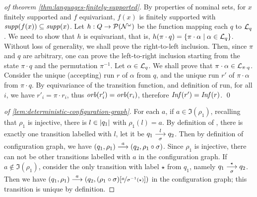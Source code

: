 
\begin{proof}[of theorem \ref{thm:languages-finitely-supported}]
By properties of nominal sets, for $x$ finitely supported and $f$ equivariant, $f(x)$ is finitely supported with $\mathit{supp}(f(x))\subseteq \mathit{supp}(x)$. Let $h : Q \to \mathcal{P}(\mathcal{N}^\omega)$ be the function mapping each $q$ to $\mathcal{L}_q$. We need to show that $h$ is equivariant, that is, $h(\pi \cdot q) = \{ \pi \cdot \alpha \mid \alpha \in \mathcal{L}_q\}$. Without loss of generality, we shall prove the right-to-left inclusion. Then, since $\pi$ and $q$ are arbitrary, one can prove the left-to-right inclusion starting from the state $\pi \cdot q$ and the permutation $\pi^{-1}$. Let $\alpha \in \mathcal{L}_q$. We shall prove that $\pi\cdot\alpha \in \mathcal{L}_{\pi\cdot q}$. Consider the unique (accepting) run $r$ of $\alpha$ from $q$, and  the unique run $r'$ of $\pi \cdot \alpha$ from $\pi \cdot q$. By equivariance of the transition function, and definition of run, for all $i$, we have $r'_i = \pi \cdot r_i$, thus $\mathit{orb}(r'_i)=\mathit{orb}(r_i)$, therefore $\mathit{Inf}(r')= \mathit{Inf}(r)$. 
\qed 
\end{proof}
%
\begin{proof}[of \cref{lem:deterministic-configuration-graph}]
 For each $a$, if $a \in \Im(\rho_1)$, recalling that $\rho_1$ is injective, there is $l \in |q_1|$ with $\rho_1(l) = a$. By definition of \hdma, there is exactly one transition labelled with $l$, let it be $q_1 \overset{l}{\underset{\sigma}{\longrightarrow}} q_2$. Then by definition of configuration graph, we have $(q_1,\rho_1) \overset{a}{\longrightarrow} (q_2,\rho_1 \circ \sigma)$. Since $\rho_1$ is injective, there can not be other transitions labelled with $a$ in the configuration graph. If $a \notin \Im(\rho_1)$, consider the only transition with label $\star$ from $q_1$, namely $q_1 \overset{\star}{\underset{\sigma}{\longrightarrow}} q_2$.  Then we have $(q_1,\rho_1) \overset{a}{\longrightarrow} (q_2,(\rho_1 \circ \sigma)[\nicefrac{a}{\sigma^{-1}(\star)}])$ in the configuration graph; this transition is unique by definition.
\end{proof}

